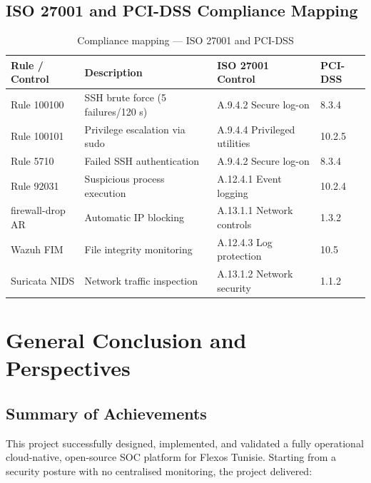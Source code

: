 \documentclass[12pt,a4paper]{report}
\begin{document}
\section{ISO 27001 and PCI-DSS Compliance Mapping}

\begin{table}[H]
\centering
\caption{Compliance mapping --- ISO 27001 and PCI-DSS}
\begin{tabularx}{\textwidth}{llXl}
\toprule
\textbf{Rule / Control} & \textbf{Description} & \textbf{ISO 27001 Control} & \textbf{PCI-DSS} \\
\midrule
Rule 100100 & SSH brute force (5 failures/120 s) & A.9.4.2 Secure log-on & 8.3.4 \\
Rule 100101 & Privilege escalation via sudo       & A.9.4.4 Privileged utilities & 10.2.5 \\
Rule 5710   & Failed SSH authentication           & A.9.4.2 Secure log-on & 8.3.4 \\
Rule 92031  & Suspicious process execution        & A.12.4.1 Event logging & 10.2.4 \\
firewall-drop AR & Automatic IP blocking          & A.13.1.1 Network controls & 1.3.2 \\
Wazuh FIM   & File integrity monitoring           & A.12.4.3 Log protection & 10.5 \\
Suricata NIDS & Network traffic inspection        & A.13.1.2 Network security & 1.1.2 \\
\bottomrule
\end{tabularx}
\label{tab:compliance}
\end{table}

\chapter*{General Conclusion and Perspectives}

\section*{Summary of Achievements}

This project successfully designed, implemented, and validated a fully operational cloud-native, open-source SOC platform for Flexos Tunisie. Starting from a security posture with no centralised monitoring, the project delivered:
\end{document}
